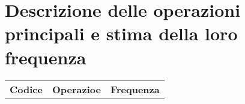 \documentclass[12pt]{report}
\begin{document}
\section{Descrizione delle operazioni principali e stima della loro frequenza}

\begin{table}[h!]
    \centering
    \renewcommand{\arraystretch}{1.5} %
    \begin{tabularx}{\textwidth}{
    >{\raggedright\arraybackslash}p{}%
    >{\raggedright\arraybackslash}p{}%
    >{\raggedright\arraybackslash}p{}%
    }
    \arrayrulecolor[HTML]{BDBFC3}
    \rowcolor[HTML]{cef3fe}
    \textbf{Codice} & \textbf{Operazioe} & \textbf{Frequenza} \\
    \end{tabularx}
\end{table}
\end{document}
